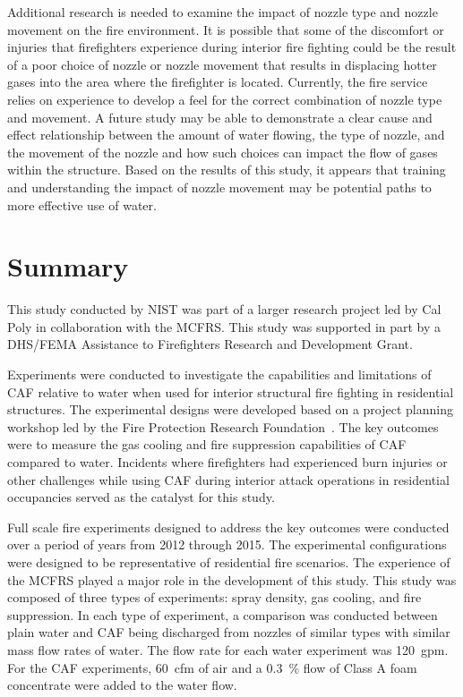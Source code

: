 \documentclass[12pt,oneside]{book}
\begin{document}
Additional research is needed to examine the impact of nozzle type and nozzle movement on the fire environment. It is possible that some of the discomfort or injuries that firefighters experience during interior fire fighting could be the result of a poor choice of nozzle or nozzle movement that results in displacing hotter gases into the area where the firefighter is located. Currently, the fire service relies on experience to develop a feel for the correct combination of nozzle type and movement. A future study may be able to demonstrate a clear cause and effect relationship between the amount of water flowing, the type of nozzle, and the movement of the nozzle and how such choices can impact the flow of gases within the structure. Based on the results of this study, it appears that training and understanding the impact of nozzle movement may be potential paths to more effective use of water. 

\chapter{Summary}
\label{chap:Summary}

This study conducted by NIST was part of a larger research project led by Cal Poly in collaboration with the MCFRS. This study was supported in part by a DHS/FEMA Assistance to Firefighters Research and Development Grant.  

Experiments were conducted to investigate the capabilities and limitations of CAF relative to water when used for interior structural fire fighting in residential structures. The experimental designs were developed based on a project planning workshop led by the Fire Protection Research Foundation~\cite{Grant:2011}. The key outcomes were to measure the gas cooling and fire suppression capabilities of CAF compared to water. Incidents where firefighters had experienced burn injuries or other challenges while using CAF during interior attack operations in residential occupancies served as the catalyst for this study.

Full scale fire experiments designed to address the key outcomes were conducted over a period of years from 2012 through 2015. The experimental configurations were designed to be representative of residential fire scenarios. The experience of the MCFRS played a major role in the development of this study. This study was composed of three types of experiments: spray density, gas cooling, and fire suppression. In each type of experiment, a comparison was conducted between plain water and CAF being discharged from nozzles of similar types with similar mass flow rates of water. The flow rate for each water experiment was 120~gpm. For the CAF experiments, 60~cfm of air and a 0.3~\% flow of Class A foam concentrate were added to the water flow.
\end{document}
